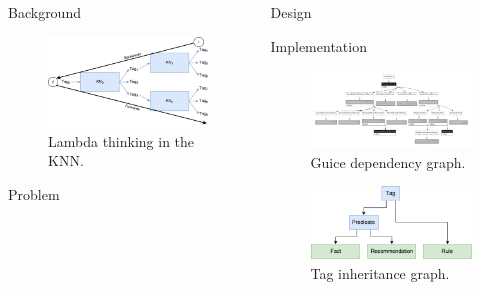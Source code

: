 \documentclass[final]{beamer} %
\begin{document}
\begin{columns}
\begin{column}{.3\textwidth}
\begin{block}{Background}
				\begin{figure}[!htb]
					\includegraphics[width=0.5\columnwidth]{figures/lambda_thinking.pdf}
					\caption{Lambda thinking in the KNN.}
					\label{think_lambda}
				\end{figure}
			\end{block}
			\begin{block}{Problem}
			\end{block}
	\end{column}
	\begin{column}{.35\textwidth}
		\begin{block}{Design}
		\end{block}
		\begin{block}{Implementation}
		\begin{figure}[!htb]
			\centering
			\includegraphics[width=\columnwidth]{figures/guice_graph.pdf}
			\caption
			{Guice dependency graph.}
		\end{figure}
	
		\begin{figure}[!htb]
			\centering
			\includegraphics[width=0.5\columnwidth]{figures/prometheus_tags.pdf}
			\caption
			{Tag inheritance graph.}
		\end{figure}
		

\end{block}
\end{column}
\end{columns}
\end{document}
